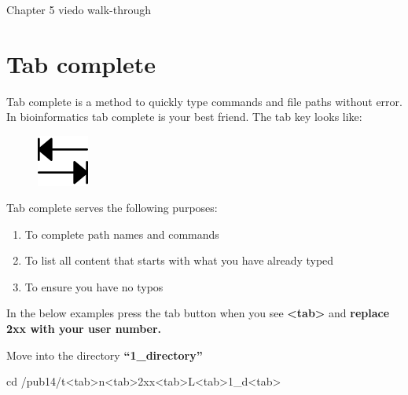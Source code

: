 \documentclass[
  letterpaper,
  DIV=11,
  numbers=noendperiod]{scrreprt}
\newenvironment{Shaded}{\begin{snugshade}}{\end{snugshade}}
\newcommand{\BuiltInTok}[1]{\textcolor[rgb]{0.00,0.23,0.31}{#1}}
\newcommand{\NormalTok}[1]{\textcolor[rgb]{0.00,0.23,0.31}{#1}}
\newcommand{\OperatorTok}[1]{\textcolor[rgb]{0.37,0.37,0.37}{#1}}
\providecommand{\tightlist}{%
  \setlength{\itemsep}{0pt}\setlength{\parskip}{0pt}}\usepackage{longtable,booktabs,array}
\begin{document}
Chapter 5 viedo walk-through

\hypertarget{tab-complete}{%
\section{Tab complete}\label{tab-complete}}

Tab complete is a method to quickly type commands and file paths without
error. In bioinformatics tab complete is your best friend. The tab key
looks like:

\begin{figure}

{\centering \includegraphics[width=0.15\textwidth,height=\textheight]{figures/tab_complete.png}

}

\end{figure}

Tab complete serves the following purposes:

\begin{enumerate}
\def\labelenumi{\arabic{enumi}.}
\tightlist
\item
  To complete path names and commands
\item
  To list all content that starts with what you have already typed
\item
  To ensure you have no typos
\end{enumerate}

In the below examples press the tab button when you see
\textbf{\textless tab\textgreater{}} and \textbf{replace 2xx with your
user number.}

Move into the directory \textbf{``1\_directory''}

\begin{Shaded}
\begin{Highlighting}[]
\BuiltInTok{cd}\NormalTok{ /pub14/t}\OperatorTok{\textless{}}\NormalTok{tab}\OperatorTok{\textgreater{}}\NormalTok{n}\OperatorTok{\textless{}}\NormalTok{tab}\OperatorTok{\textgreater{}}\NormalTok{2xx}\OperatorTok{\textless{}}\NormalTok{tab}\OperatorTok{\textgreater{}}\NormalTok{L}\OperatorTok{\textless{}}\NormalTok{tab}\OperatorTok{\textgreater{}}\NormalTok{1\_d}\OperatorTok{\textless{}}\NormalTok{tab}\OperatorTok{\textgreater{}}
\end{Highlighting}
\end{Shaded}
\end{document}
